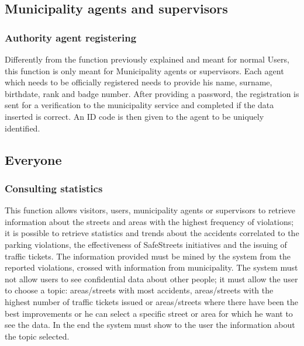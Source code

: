 \documentclass[a4paper]{report}
\begin{document}
\subsection{Municipality agents and supervisors}
\subsubsection{Authority agent registering}
Differently from the function previously explained and meant for normal Users, this function is only meant for Municipality agents or supervisors. Each agent which needs to be officially registered needs to provide his name, surname, birthdate, rank and badge number. After providing a password, the registration is sent for a verification to the municipality service and completed if the data inserted is correct. An ID code is then given to the agent to be uniquely identified.

\subsection{Everyone} 

\subsubsection{Consulting statistics}
This function allows visitors, users, municipality agents or supervisors to retrieve information about the streets and areas with the highest frequency of violations; it is possible to retrieve statistics and trends about the accidents correlated to the parking violations, the effectiveness of SafeStreets initiatives and the issuing of traffic tickets. The information provided must be mined by the system from the reported violations, crossed with information from municipality. The system must not allow users to see confidential data about other people; it must allow the user to choose a topic: areas/streets with most accidents, areas/streets with the highest number of traffic tickets issued or areas/streets where there have been the best improvements or he can select a specific street or area for which he want to see the data. In the end the system must show to the user the information about the topic selected.
\end{document}
